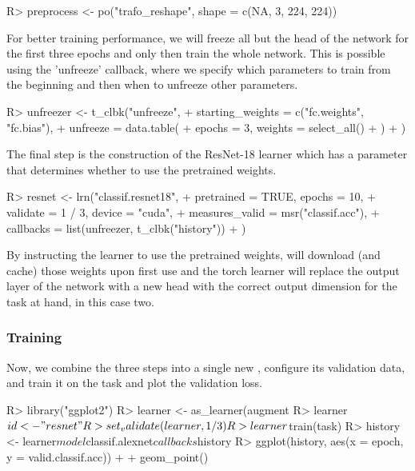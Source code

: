 \documentclass[article]{jss}
\theoremstyle{definition}
\begin{document}
\begin{CodeInput}
R> preprocess <- po("trafo_reshape", shape = c(NA, 3, 224, 224))
\end{CodeInput}

For better training performance, we will freeze all but the head of the network for the first three epochs and only then train the whole network.
This is possible using the 'unfreeze' callback, where we specify which parameters to train from the beginning and then when to unfreeze other parameters.

\begin{CodeInput}
R> unfreezer <- t_clbk("unfreeze",
+    starting_weights = c("fc.weights", "fc.bias"),
+    unfreeze = data.table(
+      epochs = 3, weights = select_all()
+    )
+ )
\end{CodeInput}

The final step is the construction of the ResNet-18 learner which has a parameter  that determines whether to use the pretrained weights.

\begin{CodeInput}
R> resnet <- lrn("classif.resnet18",
+    pretrained = TRUE, epochs = 10,
+    validate = 1 / 3, device = "cuda",
+    measures_valid = msr("classif.acc"),
+    callbacks = list(unfreezer, t_clbk("history"))
+  )
\end{CodeInput}

By instructing the learner to use the pretrained weights,  will download (and cache) those weights upon first use and the torch learner will replace the output layer of the network with a new head with the correct output dimension for the task at hand, in this case two.

\subsubsection{Training}

Now, we combine the three steps into a single new , configure its validation data, and train it on the task and plot the validation loss.

\begin{CodeInput}
R> library("ggplot2")
R> learner <- as_learner(augment %
R> learner$id <- "resnet"
R> set_validate(learner, 1 / 3)
R> learner$train(task)
R> history <- learner$model$classif.alexnet$callbacks$history
R> ggplot(history, aes(x = epoch, y = valid.classif.acc)) +
+    geom_point()
\end{CodeInput}
\end{document}
